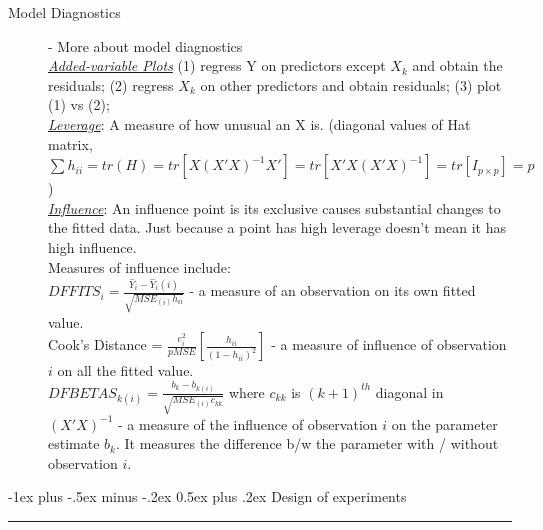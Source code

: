 \documentclass[10pt,landscape]{article}
\makeatletter
\renewcommand{\section}{\@startsection{section}{1}{0mm}%
                                {-1ex plus -.5ex minus -.2ex}%
                                {0.5ex plus .2ex}%
                                {\normalfont\large\bfseries}}
\makeatother
\begin{document}
\begin{multicols}{3}
\begin{description}
		
    		
    \end{description}    
    
    
\begin{description}
	\item[Model Diagnostics] - More about model diagnostics\\
	\underline{\textit{Added-variable Plots}} (1) regress Y on predictors except $X_k$ and obtain the residuals; (2) regress $X_k$ on other predictors and obtain residuals; (3) plot (1) vs (2);\\
	\underline{\textit{Leverage}}: A measure of how unusual an X is. (diagonal values of Hat matrix, $\sum h_{ii} = tr(H) = tr[X(X'X)^{-1}X'] = tr[X'X(X'X)^{-1}] = tr[I_{p\times p}] = p$) \\
	\underline{\textit{Influence}}: An influence point is its exclusive causes substantial changes to the fitted data. Just because a point has high leverage doesn't mean it has high influence. \\
	Measures of influence include: \\
	$DFFITS_i = \frac{\hat{Y}_i - \hat{Y}_i(i)}{\sqrt{MSE_{(i)}h_{ii}}}$ - a measure of an observation on its own fitted value. \\
	Cook's Distance = $\frac{e_i^2}{pMSE}[\frac{h_{ii}}{(1-h_{ii})^2}]$ - a measure of influence of observation $i$ on all the fitted value. \\
	$DFBETAS_{k(i)} = \frac{b_k - b_{k(i)}}{\sqrt{MSE_{(i)}c_{kk}}}$ where $c_{kk}$ is  $(k+1)^{th}$ diagonal in $(X'X)^{-1}$ -  a measure of the influence of observation $i$ on the parameter estimate $b_k$. It measures the difference b/w the parameter with / without observation $i$. 
	
\end{description}
    

\section{Design of experiments} \smallskip \hrule height 2pt \smallskip


\end{multicols}
\end{document}
